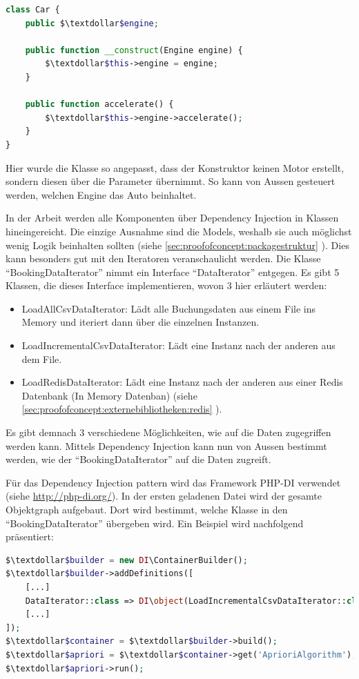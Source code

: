\begin{lstlisting}[language=php]
class Car {
	public $\textdollar$engine;
	
	public function __construct(Engine engine) {
		$\textdollar$this->engine = engine;
	}
	
	public function accelerate() {
		$\textdollar$this->engine->accelerate();
	}
}
\end{lstlisting}

Hier wurde die Klasse so angepasst, dass der Konstruktor keinen Motor erstellt, sondern diesen über die Parameter übernimmt. So kann von Aussen gesteuert werden, welchen Engine das Auto beinhaltet. 

In der Arbeit werden alle Komponenten über Dependency Injection in Klassen hineingereicht. Die einzige Ausnahme sind die Models, weshalb sie auch möglichst wenig Logik beinhalten sollten (siehe \cref{sec:proofofconcept:packagestruktur} ). Dies kann besonders gut mit den Iteratoren veranschaulicht werden. Die Klasse "`BookingDataIterator"' nimmt ein Interface "`DataIterator"' entgegen. Es gibt 5 Klassen, die dieses Interface implementieren, wovon 3 hier erläutert werden:
\begin{itemize}
	\item LoadAllCsvDataIterator: Lädt alle Buchungsdaten aus einem File ins Memory und iteriert dann über die einzelnen Instanzen.
	\item LoadIncrementalCsvDataIterator: Lädt eine Instanz nach der anderen aus dem File.
	\item LoadRedisDataIterator: Lädt eine Instanz nach der anderen aus einer Redis Datenbank (In Memory Datenban) (siehe \cref{sec:proofofconcept:externebibliotheken:redis} ).
\end{itemize}

Es gibt demnach 3 verschiedene Möglichkeiten, wie auf die Daten zugegriffen werden kann. Mittels Dependency Injection kann nun von Aussen bestimmt werden, wie der "`BookingDataIterator"' auf die Daten zugreift.

Für das Dependency Injection \gls{pattern}
 wird das Framework PHP-DI verwendet (siehe \url{http://php-di.org/}). In der ersten geladenen Datei wird der gesamte Objektgraph aufgebaut. Dort wird bestimmt, welche Klasse in den "`BookingDataIterator"' übergeben wird. Ein Beispiel wird nachfolgend präsentiert:
 
\begin{lstlisting}[language=php]
$\textdollar$builder = new DI\ContainerBuilder();
$\textdollar$builder->addDefinitions([
    [...]
    DataIterator::class => DI\object(LoadIncrementalCsvDataIterator::class),
    [...]
]);
$\textdollar$container = $\textdollar$builder->build();
$\textdollar$apriori = $\textdollar$container->get('AprioriAlgorithm');
$\textdollar$apriori->run();
\end{lstlisting}

